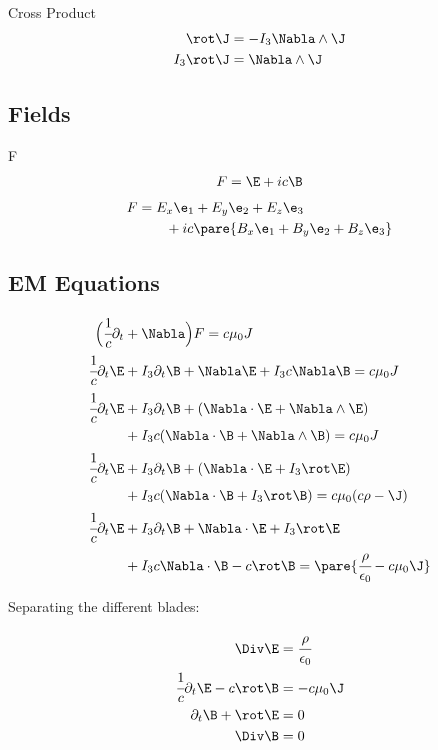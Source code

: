   \begin{remark}{Cross Product}
    \begin{align}
      \rot \J &= -I_3 \Nabla \wedge \J \\
      I_3 \rot \J &= \Nabla \wedge \J
    \end{align}
  \end{remark}

\subsection{Fields}

  \begin{definition}{F}
    \begin{align}
      F = \E + ic\B
    \end{align}
    \begin{align}
      F &= E_x\e_1 + E_y\e_2 + E_z\e_3 \nonumber \\
      &\qquad + ic\pare{B_x\e_1 + B_y\e_2 + B_z\e_3}
    \end{align}
  \end{definition}

\subsection{EM Equations}

  \begin{align}
    \Big( \cfrac{1}{c}\partial_t &+ \Nabla \Big) F = c\mu_0 J \\
    \cfrac{1}{c}\partial_t \E &+ I_3 \partial_t \B + \Nabla \E + I_3 c \Nabla \B =c\mu_0 J \\
    \cfrac{1}{c}\partial_t \E &+ I_3 \partial_t \B + (\Nabla \cdot \E + \Nabla \wedge \E) \nonumber \\
    &+ I_3 c (\Nabla \cdot \B + \Nabla \wedge \B) =c\mu_0 J\\
    \cfrac{1}{c}\partial_t \E &+ I_3 \partial_t \B + (\Nabla \cdot \E + I_3\rot \E) \nonumber \\
    &+ I_3 c (\Nabla \cdot \B + I_3\rot \B) =c\mu_0 (c\rho - \J)\\
    \cfrac{1}{c}\partial_t \E &+ I_3 \partial_t \B + \Nabla \cdot \E + I_3\rot \E \nonumber \\
    &+ I_3 c \Nabla \cdot \B -c\rot \B =\pare{\cfrac{\rho}{\epsilon_0} - c\mu_0\J}
  \end{align}

  Separating the different blades:

  \begin{align}
    \Div \E &= \cfrac{\rho}{\epsilon_0} \\
    \cfrac{1}{c}\partial_t\E - c\rot \B &= -c\mu_0\J \\
    \partial_t\B + \rot \E &= 0\\
    \Div \B &= 0
  \end{align}

